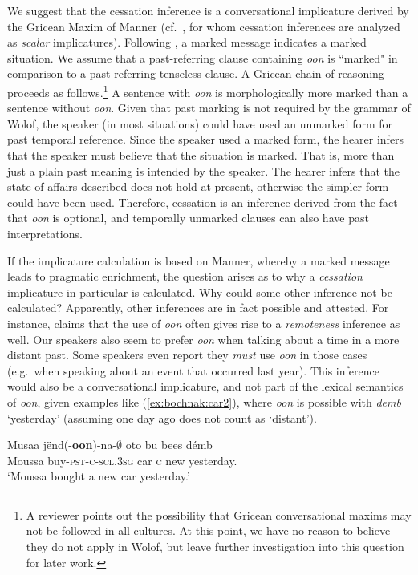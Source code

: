 \documentclass[output=paper,newtxmath,modfonts,nonflat,draftmode]{langsci/langscibook}
\begin{document}
We suggest that the cessation inference is a conversational implicature derived by the Gricean Maxim of Manner (cf.~\citealt{altshuler12moment, Cable2017a}, for whom cessation inferences are analyzed as \textit{scalar} implicatures). Following \citet{levinson00presumptive}, a marked message indicates a marked situation. We assume that a past-referring clause containing \textit{oon} is ``marked" in comparison to a past-referring tenseless clause. A Gricean chain of reasoning proceeds as follows.\footnote{A reviewer points out the possibility that Gricean conversational maxims may not be followed in all cultures. At this point, we have no reason to believe they do not apply in Wolof, but leave further investigation into this question for later work.} A sentence with \textit{oon} is morphologically more marked than a sentence without \textit{oon}. Given that past marking is not required by the grammar of Wolof, the speaker (in most situations) could have used an unmarked form for past temporal reference. Since the speaker used a marked form, the hearer infers that the speaker must believe that the situation is marked. That is, more than just a plain past meaning is intended by the speaker. The hearer infers that the state of affairs described does not hold at present, otherwise the simpler form could have been used. Therefore, cessation is an inference derived from the fact that \textit{oon} is optional, and temporally unmarked clauses can also have past interpretations. 

If the implicature calculation is based on Manner, whereby a marked message leads to pragmatic enrichment, the question arises as to why a \textit{cessation} implicature in particular is calculated. Why  could some other inference not be calculated? Apparently, other inferences are in fact possible and attested. For instance, \citet{church81systeme} claims that the use of \textit{oon}
often gives rise to a \textit{remoteness} inference as well. Our speakers also seem to prefer \textit{oon} when talking about a time in a more distant past. Some speakers even report they \textit{must} use \textit{oon} in those cases (e.g.~when speaking about an event that occurred last year). This inference would also be a conversational implicature, and not part of the lexical semantics of \textit{oon}, given examples like (\ref{ex:bochnak:car2}), where \textit{oon} is possible with \textit{demb} `yesterday' (assuming one day ago does not count as `distant').

\ea\label{ex:bochnak:car2}
\gll Musaa j\"end(-\textbf{oon})-na-$\emptyset$ oto bu bees d\'emb \\
Moussa buy\textsc{-pst-c-scl.3sg} car \textsc{c} new yesterday. \\
\glt `Moussa bought a new car yesterday.'
\z
\end{document}
